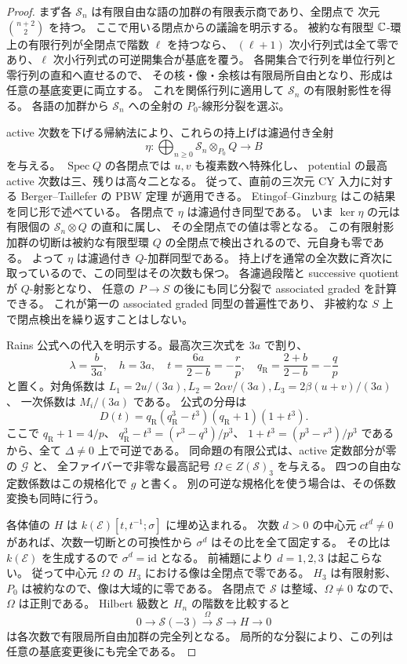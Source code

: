 \begin{proof}
まず各 $\mathscr S_n$ は有限自由な語の加群の有限表示商であり、全閉点で
次元 $\binom{n+2}{2}$ を持つ。
ここで用いる閉点からの議論を明示する。
被約な有限型 $\mathbb C$-環上の有限行列が全閉点で階数 $\ell$ を持つなら、
$(\ell+1)$ 次小行列式は全て零であり、$\ell$ 次小行列式の可逆開集合が基底を覆う。
各開集合で行列を単位行列と零行列の直和へ直せるので、
その核・像・余核は有限局所自由となり、形成は任意の基底変更に両立する。
これを関係行列に適用して $\mathscr S_n$ の有限射影性を得る。
各語の加群から $\mathscr S_n$ への全射の $P_0$-線形分裂を選ぶ。

active 次数を下げる帰納法により、これらの持上げは濾過付き全射
\[
 \eta:\bigoplus_{n\geq0}\mathscr S_n\otimes_{P_0}Q\longrightarrow B
\]
を与える。
$\operatorname{Spec}Q$ の各閉点では $u,v$ も複素数へ特殊化し、
potential の最高 active 次数は三、残りは高々二となる。
従って、直前の三次元 CY 入力に対する Berger--Taillefer の PBW 定理
\cite[Theorem~3.1]{BT} が適用できる。
Etingof--Ginzburg \cite[Proposition~7.3.1(ii)]{EG} はこの結果を同じ形で述べている。
各閉点で $\eta$ は濾過付き同型である。
いま $\ker\eta$ の元は有限個の $\mathscr S_n\otimes Q$ の直和に属し、
その全閉点での値は零となる。
この有限射影加群の切断は被約な有限型環 $Q$ の全閉点で検出されるので、元自身も零である。
よって $\eta$ は濾過付き $Q$-加群同型である。
持上げを通常の全次数に斉次に取っているので、この同型はその次数も保つ。
各濾過段階と successive quotient が $Q$-射影となり、
任意の $P\to S$ の後にも同じ分裂で associated graded を計算できる。
これが第一の associated graded 同型の普遍性であり、
非被約な $S$ 上で閉点検出を繰り返すことはしない。

Rains 公式への代入を明示する。最高次三次式を $3a$ で割り、
\[
 \lambda=\frac b{3a},\quad h=3a,\quad
 t=\frac{6a}{2-b}=-\frac rp,\quad
 q_{\mathrm R}=\frac{2+b}{2-b}=-\frac qp
\]
と置く。対角係数は
$L_1=2u/(3a), L_2=2\alpha v/(3a), L_3=2\beta(u+v)/(3a)$、
一次係数は $M_i/(3a)$ である。
公式の分母は
\[
 D(t)=q_{\mathrm R}(q_{\mathrm R}^3-t^3)(q_{\mathrm R}+1)(1+t^3).
\]
ここで $q_{\mathrm R}+1=4/p$、
$q_{\mathrm R}^3-t^3=(r^3-q^3)/p^3$、
$1+t^3=(p^3-r^3)/p^3$ であるから、全て $\Delta\ne0$ 上で可逆である。
同命題の有限公式は、active 定数部分が零の $\mathcal G$ と、
全ファイバーで非零な最高記号 $\Omega\in Z(\mathscr S)_3$ を与える。
四つの自由な定数係数はこの規格化で $g$ と書く。
別の可逆な規格化を使う場合は、その係数変換も同時に行う。

各体値の $H$ は $k(\mathscr E)[t,t^{-1};\sigma]$ に埋め込まれる。
次数 $d>0$ の中心元 $ct^d\ne0$ があれば、次数一切断との可換性から
$\sigma^d$ はその比を全て固定する。
その比は $k(\mathscr E)$ を生成するので $\sigma^d=\mathrm{id}$ となる。
前補題により $d=1,2,3$ は起こらない。
従って中心元 $\Omega$ の $H_3$ における像は全閉点で零である。
$H_3$ は有限射影、$P_0$ は被約なので、像は大域的に零である。
各閉点で $\mathscr S$ は整域、$\Omega\ne0$ なので、$\Omega$ は正則である。
Hilbert 級数と $H_n$ の階数を比較すると
\begin{equation}\label{eq:general17-elliptic-quotient}
 0\longrightarrow\mathscr S(-3)\xrightarrow{\Omega}\mathscr S
   \longrightarrow H\longrightarrow0
\end{equation}
は各次数で有限局所自由加群の完全列となる。
局所的な分裂により、この列は任意の基底変更後にも完全である。


\end{proof}
